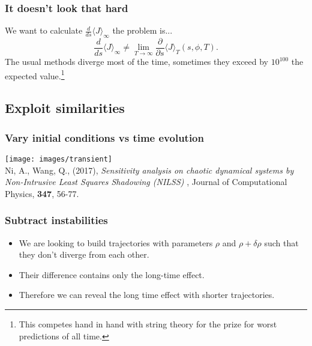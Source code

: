 \documentclass{beamer}
\begin{document}
\begin{frame}
  \frametitle{It doesn't look that hard}
  We want to calculate $\frac{d}{ds}\langle J \rangle_\infty $ the problem is...\pause
  \begin{equation}
    \frac{d}{ds} \langle J \rangle_\infty \neq \lim_{T\rightarrow \infty} \frac{\partial}{\partial s} \langle J \rangle_T (s,\phi,T).
  \end{equation}
  \pause
  The usual methods diverge most of the time, sometimes they exceed by $10^{100}$ the expected value.\footnote{This competes hand in hand with string theory for the prize for worst predictions of all time.}
\end{frame}


\subsection{Exploit similarities}

\begin{frame}
  \frametitle{Vary initial conditions vs time evolution}
  \begin{center}

    \texttt{[image: images/transient]}\\


\tiny{Ni, A., Wang, Q., (2017), \textit{Sensitivity analysis on chaotic dynamical systems by Non-Intrusive Least Squares Shadowing (NILSS)} , Journal of Computational Physics, \textbf{347}, 56-77.}
\end{center}
\end{frame}


\begin{frame}
  \frametitle{Subtract instabilities}

  \begin{itemize}
    \item We are looking to build trajectories with parameters $\rho$ and $\rho + \delta \rho$ such that they don't diverge from each other.\pause
    \item Their difference contains only the long-time effect.
    \item   Therefore we can reveal the long time effect with shorter trajectories.
  \end{itemize}
\end{frame}
\end{document}
